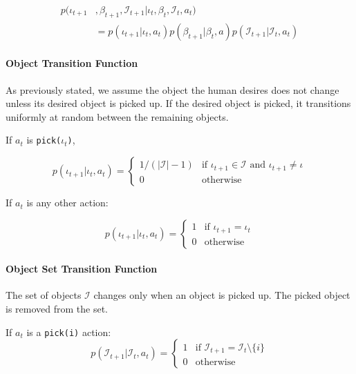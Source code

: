 \documentclass[conference]{IEEEtran}
\newcommand{\Iota}{\mathcal{I}}
\begin{document}
\begin{align*}
	p(\iota_{t+1}&, \beta_{t+1}, \Iota_{t+1} | \iota_t, \beta_t, \Iota_t, a_t) \\
	&=  p(\iota_{t+1} | \iota_t, a_t) p(\beta_{t+1} | \beta_t, a) p(\Iota_{t+1} | \Iota_t, a_t)
\end{align*}

\paragraph{Object Transition Function}
As previously stated, we assume the object the human desires does not change unless its desired object is picked up. If the desired object is picked, it transitions uniformly at random between the remaining objects. 

If $a_t$ is \texttt{pick($\iota_t$)}, 

\begin{equation*}
	p(\iota_{t+1} | \iota_t, a_t) = \begin{cases}
		1/(|\Iota|-1) & \text{if } \iota_{t+1} \in \Iota \text{ and } \iota_{t+1} \ne \iota \\
		0 & \text{otherwise} 
	\end{cases}
\end{equation*}


If $a_t$ is any other action: 

\begin{equation*}
	p(\iota_{t+1} | \iota_t, a_t) = \begin{cases} 
		1 & \text{if $\iota_{t+1} = \iota_t$} \\
		0 & \text{otherwise}
	\end{cases}
\end{equation*}

\paragraph{Object Set Transition Function}

The set of objects $\Iota$ changes only when an object is picked up. The picked object is removed from the set. 

If $a_t$ is a \texttt{pick(i)} action: 
\begin{equation*}
	p(\Iota_{t+1} | \Iota_t, a_t) = \begin{cases}
		1 & \text{if $\Iota_{t+1} = \Iota_t \setminus \{i\}$} \\ 
		0 & \text{otherwise}
	\end{cases}
\end{equation*}
\end{document}
